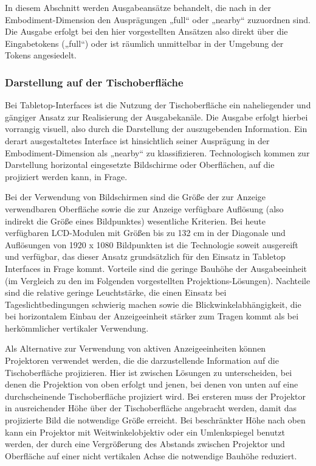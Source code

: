 In diesem Abschnitt werden Ausgabeansätze behandelt, die nach \citep{Fishkin04} in der Embodiment-Dimension den Ausprägungen „full“ oder „nearby“ zuzuordnen sind. Die Ausgabe erfolgt bei den hier vorgestellten Ansätzen also direkt über die Eingabetokens („full“) oder ist räumlich unmittelbar in der Umgebung der Tokens angesiedelt.

\subsubsection{Darstellung auf der Tischoberfläche} %
\label{ssub:darstellung_auf_der_tischoberfläche}

Bei Tabletop-Interfaces ist die Nutzung der Tischoberfläche ein naheliegender und gängiger  Ansatz zur Realisierung der Ausgabekanäle. Die Ausgabe erfolgt hierbei vorrangig visuell, also durch die Darstellung der auszugebenden Information. Ein derart ausgestaltetes Interface ist hinsichtlich seiner Ausprägung in der Embodiment-Dimension als „nearby“ zu klassifizieren. Technologisch kommen zur Darstellung horizontal eingesetzte Bildschirme oder Oberflächen, auf die projiziert werden kann, in Frage.

Bei der Verwendung von Bildschirmen sind die Größe der zur Anzeige verwendbaren Oberfläche sowie die zur Anzeige verfügbare Auflösung (also indirekt die Größe eines Bildpunktes) wesentliche Kriterien. Bei heute verfügbaren \gls{LCD}-Modulen mit Größen bis zu 132 cm in der Diagonale und Auflösungen von 1920 x 1080 Bildpunkten ist die Technologie soweit ausgereift und verfügbar, das dieser Ansatz grundsätzlich für den Einsatz in Tabletop Interfaces in Frage kommt. Vorteile sind die geringe Bauhöhe der Ausgabeeinheit (im Vergleich zu den im Folgenden vorgestellten Projektions-Lösungen). Nachteile sind die relative geringe Leuchtstärke, die einen Einsatz bei Tageslichtbedingungen schwierig machen sowie die Blickwinkelabhängigkeit, die bei horizontalem Einbau der Anzeigeeinheit stärker zum Tragen kommt als bei herkömmlicher vertikaler Verwendung.

Als Alternative zur Verwendung von aktiven Anzeigeeinheiten können Projektoren verwendet werden, die die darzustellende Information auf die Tischoberfläche projizieren. Hier ist zwischen Lösungen zu unterscheiden, bei denen die Projektion von oben erfolgt und jenen, bei denen von unten auf eine durchscheinende Tischoberfläche projiziert wird. Bei ersteren muss der Projektor in ausreichender Höhe über der Tischoberfläche angebracht werden, damit das projizierte Bild die notwendige Größe erreicht. Bei beschränkter Höhe nach oben kann ein Projektor mit Weitwinkelobjektiv oder ein Umlenkspiegel benutzt werden, der durch eine Vergrößerung des Abstands zwischen Projektor und Oberfläche auf einer nicht vertikalen Achse die notwendige Bauhöhe reduziert. 

